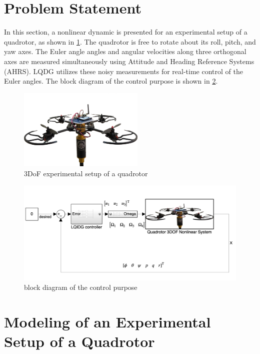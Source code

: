 \documentclass[conference]{IEEEtran}
\begin{document}
\section{Problem Statement}
In this section, a nonlinear dynamic is presented for an experimental setup of a quadrotor, as shown in \figurename{\ref{quadlab}}.
The quadrotor is free to rotate about its roll, pitch, and yaw axes. The Euler angle angles and angular velocities along three orthogonal axes are measured simultaneously using Attitude and Heading Reference Systems (AHRS). LQDG utilizes these noisy measurements for real-time control of the Euler angles. The block diagram of the control purpose is shown in \figurename{\ref{block_diagram}}.
\begin{figure}[!h]
	\includegraphics[width=6cm]{../Figures/introduction/3DOFQuad.png}
	\centering
	\caption{3DoF experimental setup of a quadrotor}
	\label{quadlab}
\end{figure}
\begin{figure}[!h]
	\includegraphics[width=.9\linewidth]{../Figures/introduction/block_diagram.png}
	\centering
	\caption{block diagram of the control purpose}
	\label{block_diagram}
\end{figure}


\section{Modeling of an Experimental Setup of a Quadrotor}
\end{document}
